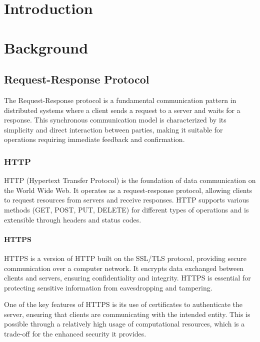 \documentclass[12pt,a4paper,twoside]{book}
\begin{document}
\setcounter{chapter}{-1}
\raggedbottom
\chapter{Introduction} \label{chap:intro}
\pagestyle{plain}
\setcounter{page}{1}




\chapter{Background}
\section{Request-Response Protocol}
The Request-Response protocol is a fundamental communication pattern in distributed systems where a client sends a request to a server and waits for a response. This synchronous communication model is characterized by its simplicity and direct interaction between parties, making it suitable for operations requiring immediate feedback and confirmation.

\subsection{HTTP}
HTTP (Hypertext Transfer Protocol) is the foundation of data communication on the World Wide Web. It operates as a request-response protocol, allowing clients to request resources from servers and receive responses. HTTP supports various methods (GET, POST, PUT, DELETE) for different types of operations and is extensible through headers and status codes.

\subsubsection{HTTPS}
HTTPS is a version of HTTP built on the SSL/TLS protocol, providing secure communication over a computer network. It encrypts data exchanged between clients and servers, ensuring confidentiality and integrity. HTTPS is essential for protecting sensitive information from eavesdropping and tampering.

One of the key features of HTTPS is its use of certificates to authenticate the server, ensuring that clients are communicating with the intended entity. This is possible through a relatively high usage of computational resources, which is a trade-off for the enhanced security it provides.
\end{document}
